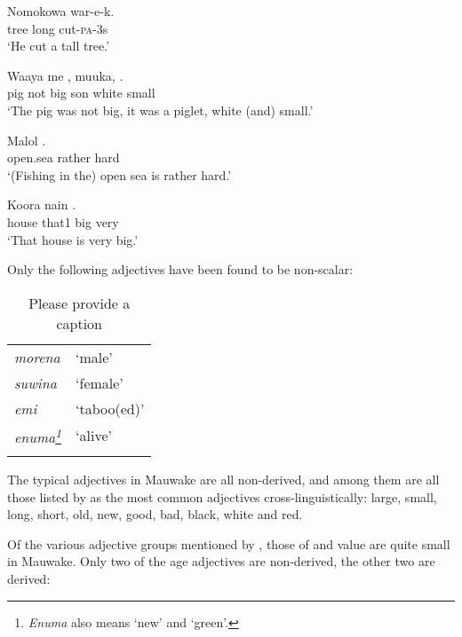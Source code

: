 \ea%
\label{ex:3:x70}
\gll Nomokowa  war-e-k. \\
tree long cut-\textsc{pa}-3s\\
\glt`He cut a tall tree.'
\z

\ea%
\label{ex:3:x71}
\gll Waaya me , muuka,  . \\
pig not big son white small\\
\glt`The pig was not big, it was a piglet, white (and) small.'
\z

\ea%
\label{ex:3:x72}
\gll Malol  . \\
open.sea rather hard\\
\glt`(Fishing in the) open sea is rather hard.'
\z

\ea%
\label{ex:3:x73}
\gll Koora nain  . \\
house that1 big very\\
\glt`That house is very big.'
\z

Only the following adjectives have been found to be non-scalar:

\begin{table}
\caption{Please provide a caption}

\begin{tabular}{>{\itshape}ll}
\mytoprule
morena &`male'\\
suwina &`female'\\
emi &`taboo(ed)'\\
enuma\footnote{\textit{Enuma} also means `new' and `green'.} &`alive'\\
\mybottomrule
\end{tabular}
\end{table}

The typical adjectives in Mauwake are all non-derived, and among them are all those listed by \citet[23]{Dixon1977} as the most common adjectives cross-linguistically: large, small, long, short, old, new, good, bad, black, white and red.

Of the various adjective groups mentioned by \citet{Dixon1977}, those of  and value are quite small in Mauwake. Only two of the age adjectives are non-derived, the other two are derived:

